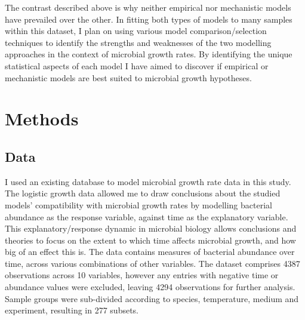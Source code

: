 \documentclass[11pt, titlepage]{article}
\begin{document}
    The contrast described above is why neither empirical nor mechanistic models have prevailed over the other. In fitting both types of models to many samples within this dataset, I plan on using various model comparison/selection techniques to identify the strengths and weaknesses of the two modelling approaches in the context of microbial growth rates. By identifying the unique statistical aspects of each model I have aimed to discover if empirical or mechanistic models are best suited to microbial growth hypotheses.

    \section*{Methods}

    \subsection*{Data}
    I used an existing database to model microbial growth rate data in this study. The logistic growth data allowed me to draw conclusions about the studied models' compatibility with microbial growth rates by modelling bacterial abundance as the response variable, against time as the explanatory variable. This explanatory/response dynamic in microbial biology allows conclusions and theories to focus on the extent to which time affects microbial growth, and how big of an effect this is. The data contains measures of bacterial abundance over time, across various combinations of other variables. The dataset comprises 4387 observations across 10 variables, however any entries with negative time or abundance values were excluded, leaving 4294 observations for further analysis. Sample groups were sub-divided according to species, temperature, medium and experiment, resulting in 277 subsets. 
\end{document}
